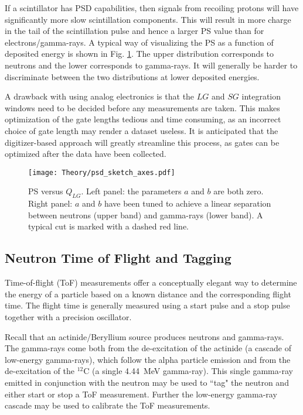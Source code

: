 \documentclass[main.tex]{subfiles}
\begin{document}
If a scintillator has PSD capabilities, then signals from recoiling protons will have significantly more slow scintillation components. This will result in more charge in the tail of the scintillation pulse and hence a larger PS value than for electrons/gamma-rays. A typical way of visualizing the PS as a function of deposited energy is shown in Fig. \ref{fig:psd_sketch}. The upper distribution corresponds to neutrons and the lower corresponds to gamma-rays. It will generally be harder to discriminate between the two distributions at lower deposited energies.

A drawback with using analog electronics is that the $LG$ and $SG$ integration windows need to be decided before any measurements are taken. This makes optimization of the gate lengths tedious and time consuming, as an incorrect choice of gate length may render a dataset useless. It is anticipated that the digitizer-based approach will greatly streamline this process, as gates can be optimized after the data have been collected.
\begin{figure}[ht]
    \centering
        \texttt{[image: Theory/psd\_sketch\_axes.pdf]}
        \caption[PS versus $Q_{LG}$]{PS versus $Q_{LG}$. Left panel: the parameters $a$ and $b$ are both zero. Right panel: $a$ and $b$ have been tuned to achieve a linear separation between neutrons (upper band) and gamma-rays (lower band). A typical cut is marked with a dashed red line.}
    \label{fig:psd_sketch} 
\end{figure}


\subsection{Neutron Time of Flight and Tagging}\label{sec:tof}
Time-of-flight (ToF) measurements offer a conceptually elegant way to determine the energy of a particle based on a known distance and the corresponding flight time. The flight time is generally measured using a start pulse and a stop pulse together with a precision oscillator.

Recall that an actinide/Beryllium source produces neutrons and gamma-rays. The gamma-rays come both from the de-excitation of the actinide (a cascade of low-energy gamma-rays), which follow the alpha particle emission and from the de-excitation of the $^\textrm{12}$C (a single \SI{4.44}{\MeV} gamma-ray). This single gamma-ray emitted in conjunction with the neutron may be used to ``tag" the neutron and either start or stop a ToF measurement. Further the low-energy gamma-ray cascade may be used to calibrate the ToF measurements.
\end{document}

